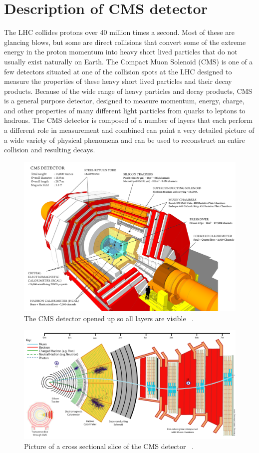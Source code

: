 	
	
	\section{Description of CMS detector}        
		The LHC collides protons over 40 million times a second. Most of these are glancing blows, but some are direct collisions that convert some of the extreme energy in the proton momentum into heavy short lived particles that do not usually exist naturally on Earth. The Compact Muon Solenoid (CMS) is one of a few detectors situated at one of the collision spots at the LHC designed to measure the properties of these heavy short lived particles and their decay products. Because of the wide range of heavy particles and decay products, CMS is a general purpose detector, designed to measure momentum, energy, charge, and other properties of many different light particles from quarks to leptons to hadrons. The CMS detector is composed of a number of layers that each perform a different role in measurement and combined can paint a very detailed picture of a wide variety of physical phenomena and can be used to reconstruct an entire collision and resulting decays.\\
		
\begin{figure}[h]
\begin{center}
\includegraphics[width=0.48\linewidth]{Figs/cms_detector_internal.png}
\caption{\label{fig:cms_slice}
The CMS detector opened up so all layers are visible ~\cite{http://cms.web.cern.ch/news/cms-detector-design}.
}
\end{center}
\end{figure} 

		
\begin{figure}[h]
\begin{center}
\includegraphics[width=0.48\linewidth]{Figs/CMS_Slice.png}
\caption{\label{fig:cms_slice}
Picture of a cross sectional slice of the CMS detector ~\cite{https://cms-docdb.cern.ch/cgi-bin/PublicDocDB/ShowDocument?docid=4172}.
}
\end{center}
\end{figure} 

